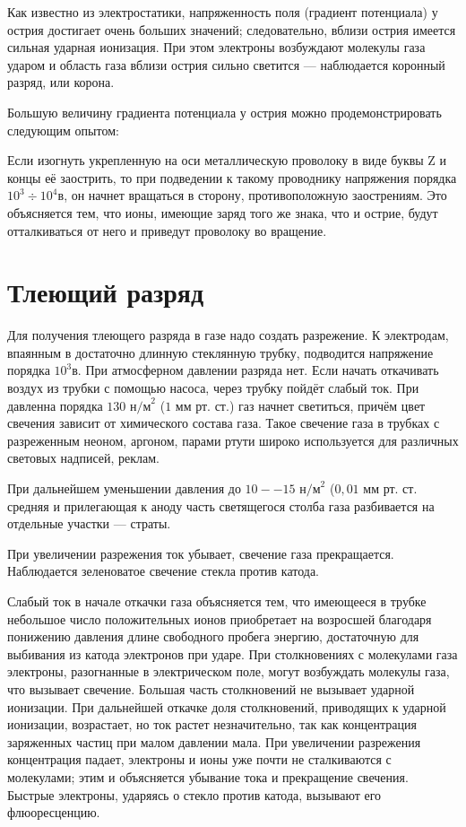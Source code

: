 \documentclass[a4paper,10pt]{book}
\begin{document}
Как известно из электростатики, напряженность поля (градиент потенциала) у острия достигает очень больших значений; следовательно, вблизи острия имеется сильная ударная ионизация. При этом электроны возбуждают молекулы газа ударом и область газа вблизи острия сильно светится — наблюдается коронный разряд, или корона.

Большую величину градиента потенциала у острия можно продемонстрировать следующим опытом:

Если изогнуть укрепленную на оси металлическую проволоку в виде буквы Z и концы её заострить, то при подведении к такому проводнику напряжения порядка $10^3 \div 10^4 \textit{в}$, он начнет вращаться в сторону, противоположную заострениям. Это объясняется тем, что ионы, имеющие заряд того же знака, что и острие, будут отталкиваться от него и приведут проволоку во вращение.

\section{Тлеющий разряд}

Для получения тлеющего разряда в газе надо создать разрежение. К электродам, впаянным в достаточно длинную стеклянную трубку, подводится напряжение порядка $10^3 \textit{в}$. При атмосферном давлении разряда нет. Если начать откачивать воздух из трубки с помощью насоса, через трубку пойдёт слабый ток. При давленна порядка $130 \textit{ н/м}^2$ ($1\textit{ мм рт. ст.}$) газ начнет светиться, причём цвет свечения зависит от химического состава газа. Такое свечение газа в трубках с разреженным неоном, аргоном, парами ртути широко используется для различных световых надписей, реклам.

При дальнейшем уменьшении давления до $10 -- 15 \textit{ н/м}^2$ ($0,01\textit{ мм рт. ст.}$ средняя и прилегающая к аноду часть светящегося столба газа разбивается на отдельные участки — страты.

При увеличении разрежения ток убывает, свечение газа прекращается. Наблюдается зеленоватое свечение стекла против катода.

Слабый ток в начале откачки газа объясняется тем, что имеющееся в трубке небольшое число положительных ионов приобретает на возросшей благодаря понижению давления длине свободного пробега энергию, достаточную для выбивания из катода электронов при ударе. При столкновениях с молекулами газа электроны, разогнанные в электрическом поле, могут возбуждать молекулы газа, что вызывает свечение. Большая часть столкновений не вызывает ударной ионизации. При дальнейшей откачке доля столкновений, приводящих к ударной ионизации, возрастает, но ток растет незначительно, так как концентрация заряженных частиц при малом давлении мала. При увеличении разрежения концентрация падает, электроны и ионы уже почти не сталкиваются с молекулами; этим и объясняется убывание тока и прекращение свечения. Быстрые электроны, ударяясь о стекло против катода, вызывают его флюоресценцию.
\end{document}
